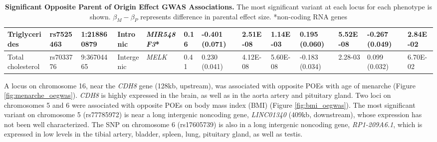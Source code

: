 \begin{table}
\begin{adjustbox}{width={\textwidth}}
\begin{tabular}{@{}p{3cm}|p{1.8cm}p{2cm}p{2cm}p{2cm}p{0.8cm}p{1.8cm}p{2.5cm}|p{1.8cm}p{1.8cm}|p{1.8cm}p{1.8cm}|p{1.8cm}@{}}
Triglycerides & rs7525463 & 1:218860879 & Intronic & \emph{MIR548F3}* & 0.16 & -0.401 (0.071) & 2.51E-08 & 1.14E-03 & 0.195 (0.060)  & 5.52E-08 & -0.267 (0.049)	& 2.84E-02\\ \hline
Total cholesterol & rs7033776 & 9:36704465 & Intergenic & \emph{MELK} & 0.41 & 0.230 (0.041) & 4.12E-08 & 5.60E-08	& -0.183 (0.034) & 2.28-03 & 0.099 (0.032) & 6.70E-02\\ \hline
\bottomrule
\end{tabular}
\end{adjustbox}
\caption[Significant Opposite Parent of Origin Effect GWAS Associations.]{\textbf{Significant Opposite Parent of Origin Effect GWAS Associations.} The most significant variant at each locus for each phenotype is shown.  $\beta_{M}-\beta_{P}$ represents difference in parental effect size.
*non-coding RNA genes
}
\label{tab:oppparent}
\end{table}




A locus on chromosome 16, near the \emph{CDH8} gene (128kb, upstream), was associated with opposite POEs with age of menarche (Figure \ref{fig:menarche_oegwas}). \emph{CDH8} is highly expressed in the brain, as well as in the aorta artery and pituitary gland. Two loci on chromosomes 5 and 6 were associated with opposite POEs on body mass index (BMI) (Figure \ref{fig:bmi_oegwas}). The most significant variant on chromosome 5 (rs77785972) is near a long intergenic noncoding gene, \emph{LINC01340} (409kb, downstream), whose expression has not been well characterized. The SNP on chromosome 6 (rs17605739) is also in a long intergenic noncoding gene, \emph{RP1-209A6.1}, which is expressed in low levels in the tibial artery, bladder, spleen, lung, pituitary gland, as well as testis. 


